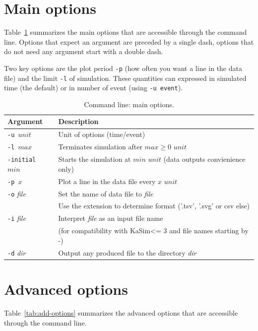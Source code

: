 \documentclass[11pt]{book}
\def\KaSim{\textsf{KaSim}}
\def\ttt#1{\texttt{#1}}
\begin{document}
\section{Main options}

Table~\ref{tab:options} summarizes the main options that are
accessible through the command line. Options that expect an argument
are preceded by a single dash, options that do not need any argument
start with a double dash.

Two key options are the plot period \ttt{-p} (how often you want a
line in the data file) and the limit \ttt{-l} of simulation. These
quantities can expressed in simulated time (the default) or in number
of event (using \ttt{-u event}).

\begin{table}[h!]
\caption{Command line: main options.}
\centering
\begin{tabular}{|l|l|}
\hline
Argument & Description \\ \hline
\ttt{-u $unit$} & Unit of options (time/event)\\
\ttt{-l $max$} & Terminates simulation after $max \geq 0$ $unit$\\
\ttt{-initial $min$} & Starts the simulation at $min$ $unit$ (data outputs convienience only)\\
\ttt{-p $x$} & Plot a line in the data file every $x$ $unit$\\
\ttt{-o} \textit{file} & Set the name of data file to \textit{file}\\
&Use the extension to determine format ('.tsv', '.svg' or csv else)\\
\ttt{-i} \textit{file} & Interpret \textit{file} as an input file name\\
& (for compatibility with \KaSim <= 3 and file names starting by -)\\
\ttt{-d} \textit{dir} & Output any produced file to the directory \textit{dir}\\
\hline
\end{tabular}
\label{tab:options}
\end{table}%

\section{Advanced options}

Table~\ref{tab:add-options} summarizes the advanced options that are accessible through the command line.
\end{document}
